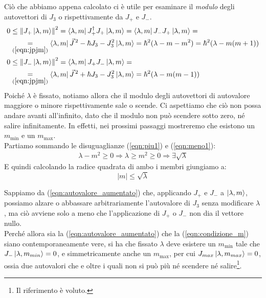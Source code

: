 \documentclass[../../FisicaTeorica.tex]{subfiles}
\begin{document}
Ciò che abbiamo appena calcolato ci è utile per esaminare il \textit{modulo} degli autovettori di $J_3$  o  rispettivamente da $J_+$ e $J_-$.
\begin{align}\nonumber
0 &\leq \left\lVert J_+ \ket{\lambda,m}\right\rVert^2 = \bra{\lambda, m} J_+^\dag J_+ \ket{\lambda, m} = \bra{\lambda, m}J_- J_+ \ket{\lambda, m} =\\
&\underset{(\ref{eqn:jpjm})}{=} \bra{\lambda, m} \vec{J}^{\,2} - \hbar J_3 - J_3^2 \ket{\lambda, m}= \hbar^2 (\lambda - m - m^2) = \hbar^2(\lambda-m(m+1))
\label{eqn:piu1}\\
0 &\leq \left\lVert J_- \ket{\lambda,m}\right\rVert^2 = \bra{\lambda,m}J_+ J_- \ket{\lambda,m} = \nonumber \\
&\underset{(\ref{eqn:jpjm})}{=} \bra{\lambda,m}\vec{J}^{\,2} + \hbar J_3 - J_3^2 \ket{\lambda,m} = \hbar^2 (\lambda-m(m-1)) \label{eqn:meno1}
\end{align}
Poiché $\lambda$ è fissato, notiamo allora che il modulo degli autovettori di autovalore maggiore o minore rispettivamente sale o scende. Ci aspettiamo che ciò non possa andare avanti all'infinito, dato che il modulo non può scendere sotto zero, né salire infinitamente. In effetti, nei prossimi passaggi mostreremo che esistono un $m_{\min}$ e un $m_{\max}$.\\

Partiamo sommando le disuguaglianze (\ref{eqn:piu1}) e (\ref{eqn:meno1}): 
\begin{align*}
\lambda - m^2 \geq 0 \Rightarrow \lambda \geq m^2 \geq 0 \Rightarrow  \exists \sqrt{\lambda}
\end{align*}
E quindi calcolando la radice quadrata di ambo i membri giungiamo a:
\begin{equation}
|m| \leq \sqrt{\lambda}
\label{eqn:condizione_m}
\end{equation}

Sappiamo da (\ref{eqn:autovalore_aumentato}) che, applicando $J_+$ e $J_-$ a $\ket{\lambda,m}$, possiamo alzare o abbassare arbitrariamente l'autovalore di $J_3$ senza modificare $\lambda$, ma ciò avviene solo a meno che l'applicazione di $J_+$ o $J_-$ non dia il vettore nullo.\\

Perché allora sia la (\ref{eqn:autovalore_aumentato}) che la (\ref{eqn:condizione_m}) siano contemporaneamente vere, si ha che fissato $\lambda$ deve esistere un $m_{\min}$ tale che $J_- \ket{\lambda, m_{min}}=0$, e simmetricamente anche un $m_{\max}$, per cui $J_{max}\ket{\lambda, m_{max}} = 0$, ossia due autovalori che  e oltre i quali non si può più né scendere né salire\footnote{Il riferimento è voluto.}.\\
\end{document}

